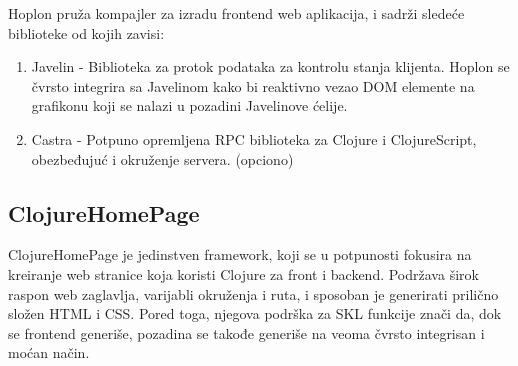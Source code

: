 Hoplon pruža kompajler za izradu frontend web aplikacija, i  sadrži sledeće biblioteke od kojih zavisi:\cite{hoplon_wiki}
    \begin{enumerate}
        \item Javelin -
        Biblioteka za protok podataka za kontrolu stanja klijenta. Hoplon se čvrsto
        integrira sa Javelinom kako bi reaktivno vezao DOM elemente na grafikonu koji se nalazi u pozadini
        Javelinove ćelije.
        \item Castra -
        Potpuno opremljena RPC biblioteka za Clojure i ClojureScript, obezbeđujuć i
        okruženje servera. (opciono)
    \end{enumerate}

\subsection{ClojureHomePage}
\label{subsec:clojurehomepage}
ClojureHomePage je jedinstven framework, koji se u potpunosti fokusira na kreiranje web stranice koja koristi Clojure za front i backend.
Podržava širok raspon web zaglavlja, varijabli okruženja i ruta, i sposoban je generirati prilično složen HTML i CSS. 
Pored toga, njegova podrška za SKL funkcije znači da, dok se frontend generiše, pozadina se takođe generiše na veoma čvrsto integrisan i moćan način.\cite{frameworks}
